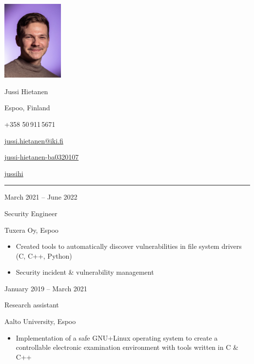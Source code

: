 \documentclass[a4paper,hidelinks,10pt]{article}
\newlength{\cvcolumngapwidth}
\newlength{\cvleftcolumnwidth}
\newlength{\cvrightcolumnwidth}
\newcommand{\cvnamestyle}[1]{{\Large\cvnamefont\textcolor{cvnamecolor}{#1}}}
\newcommand{\cvsectionstyle}[1]{{\normalsize\cvsectionfont\textcolor{cvsectioncolor}{#1}}}
\newcommand{\cvtitlestyle}[1]{{\large\cvtitlefont\textcolor{cvtitlecolor}{#1}}}
\newcommand{\cvdurationstyle}[1]{{\small\cvdurationfont\textcolor{cvdurationcolor}{#1}}}
\newlength{\cvafteritemskipamount}
\newlength{\cvaftersectionskipamount}
\newlength{\cvafternameskipamount}
\newlength{\cvafterpersonalinfolineskipamount}
\newlength{\cvaftertitleskipamount}
\newlength{\cvparskip}
\newcommand{\cvpersonalinfo}[2]{
    \begin{minipage}[t]{\cvleftcolumnwidth}
        \vspace{0mm} %
        \raggedleft #1
    \end{minipage}%
    \hspace{\cvcolumngapwidth}%
    \begin{minipage}[t]{\cvrightcolumnwidth}
        \vspace{0mm} %
        #2
    \end{minipage}

    \vspace{\cvafteritemskipamount}
}
\newcommand{\cvname}[1]{
    \cvnamestyle{#1}

    \vspace{\cvafternameskipamount}
}
\newcommand{\cvpersonalinfolinewithicon}[3]{
    \raisebox{.5\fontcharht\font`E-.5\height}{\texttt{[image: \#2]}}
    #3

    \vspace{\cvafterpersonalinfolineskipamount}
}
\newcommand{\cvsection}[1]{
    \begin{minipage}[t]{\cvleftcolumnwidth}
        \raggedleft\cvsectionstyle{#1}
    \end{minipage}%
    \hspace{\cvcolumngapwidth}%
    \begin{minipage}[t]{\cvrightcolumnwidth}
        \textcolor{cvrulecolor}{\rule{\cvrightcolumnwidth}{0.3mm}}
    \end{minipage}

    \vspace{\cvaftersectionskipamount}
}
\newcommand{\cvitem}[2]{
    \begin{minipage}[t]{\cvleftcolumnwidth}
        \raggedleft #1
    \end{minipage}%
    \hspace{\cvcolumngapwidth}%
    \begin{minipage}[t]{\cvrightcolumnwidth}
        \setlength{\parskip}{\cvparskip} #2
    \end{minipage}

    \vspace{\cvafteritemskipamount}
}
\newcommand{\cvtitle}[1]{
    \cvtitlestyle{#1}

    \vspace{\cvaftertitleskipamount}
    \vspace{-\cvparskip}
}
\begin{document}

\cvpersonalinfo{
    \includegraphics[height=40mm,trim={0cm 0 0cm 0},clip]{cvpic.jpg}}
    {
    \cvname{Jussi Hietanen}

    \cvpersonalinfolinewithicon{height=4mm}{072-location.pdf}{
        Espoo, Finland
    }

    \cvpersonalinfolinewithicon{height=4mm}{067-phone.pdf}{
        +358 50\,911\,5671
    }

    \cvpersonalinfolinewithicon{height=4mm}{070-envelop.pdf}{
        \href{mailto:jussi.hietanen@iki.fi}{jussi.hietanen@iki.fi}
    }

    \cvpersonalinfolinewithicon{height=4mm}{458-linkedin.pdf}{
        \href{https://www.linkedin.com/in/jussi-hietanen-ba0320107/}{jussi-hietanen-ba0320107}
    }
    
    \cvpersonalinfolinewithicon{height=4mm}{GitHub-Mark-120px-plus.png}{
        \href{https://github.com/jussihi}{jussihi}
    }

}

\vspace{2em}



\cvsection{LATEST WORK EXPERIENCE}

\cvitem{
    \cvdurationstyle{March  2021 -- June 2022}
}{
    \cvtitle{Security Engineer}

    Tuxera Oy, Espoo

    \begin{itemize}[leftmargin=*]
        \item Created tools to automatically discover vulnerabilities in file system drivers (C, C++, Python)
        \item Security incident \& vulnerability management
    \end{itemize}
}


\cvitem{
    \cvdurationstyle{January  2019 -- March 2021}
}{
    \cvtitle{Research assistant}

    Aalto University, Espoo

    \begin{itemize}[leftmargin=*]
        \item Implementation of a safe GNU+Linux operating system to create a controllable electronic examination environment with tools written in C \& C++
    \end{itemize}
}
\end{document}
